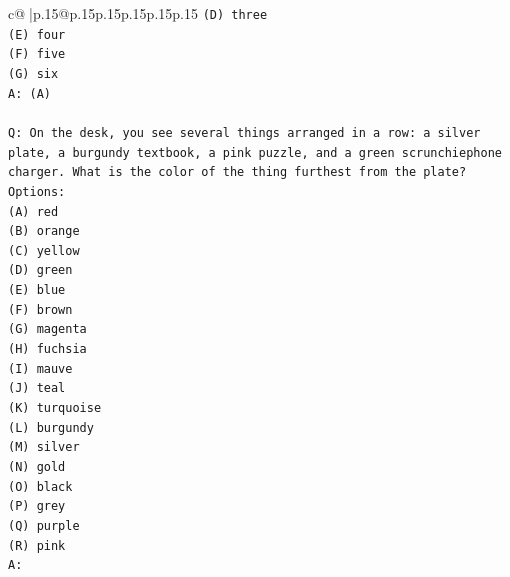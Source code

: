 \documentclass{article}
\begin{document}
{\begin{supertabular}{c@{$\;$}|p{.15\linewidth}@{}p{.15\linewidth}p{.15\linewidth}p{.15\linewidth}p{.15\linewidth}p{.15\linewidth}}
{{{\texttt{(D) three} \\
\texttt{(E) four} \\
\texttt{(F) five} \\
\texttt{(G) six} \\
\texttt{A: (A)} \\
\\ 
\texttt{Q: On the desk, you see several things arranged in a row: a silver plate, a burgundy textbook, a pink puzzle, and a green scrunchiephone charger. What is the color of the thing furthest from the plate?} \\
\texttt{Options:} \\
\texttt{(A) red} \\
\texttt{(B) orange} \\
\texttt{(C) yellow} \\
\texttt{(D) green} \\
\texttt{(E) blue} \\
\texttt{(F) brown} \\
\texttt{(G) magenta} \\
\texttt{(H) fuchsia} \\
\texttt{(I) mauve} \\
\texttt{(J) teal} \\
\texttt{(K) turquoise} \\
\texttt{(L) burgundy} \\
\texttt{(M) silver} \\
\texttt{(N) gold} \\
\texttt{(O) black} \\
\texttt{(P) grey} \\
\texttt{(Q) purple} \\
\texttt{(R) pink} \\
\texttt{A:} \\
            }
        }
    }
     \\ \\


\end{supertabular}}
\end{document}
